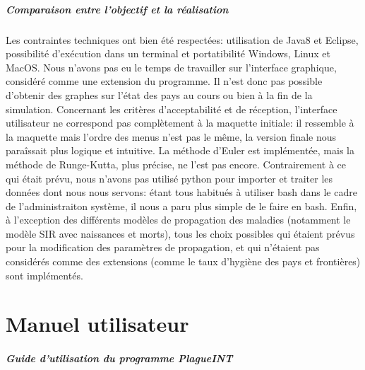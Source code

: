 \documentclass[12pt,a4paper]{report}
\begin{document}
\paragraph{Comparaison entre l'objectif et la réalisation}
\begin{flushleft}
Les contraintes techniques ont bien été respectées: utilisation de Java8 et Eclipse, possibilité d'exécution dans un terminal et portatibilité Windows, Linux et MacOS. Nous n'avons pas eu le temps de travailler sur l'interface graphique, considéré comme une 
extension du programme. Il n'est donc pas possible d'obtenir des graphes sur l'état des pays au cours ou bien à la fin de la simulation.
Concernant les critères d'acceptabilité et de réception, l'interface utilisateur ne correspond pas complètement à la maquette initiale: il ressemble à la maquette mais l'ordre des menus n'est pas le même, la version finale nous paraîssait plus logique et 
intuitive. La méthode d'Euler est implémentée, mais la méthode de Runge-Kutta, plus précise, ne l'est pas encore.
Contrairement à ce qui était prévu, nous n'avons pas utilisé python pour importer et traiter les données dont nous nous servons: étant tous habitués à utiliser bash dans le cadre de l'administraiton système, il nous a paru plus simple de le faire en bash.
Enfin, à l'exception des différents modèles de propagation des maladies (notamment le modèle SIR avec naissances et morts), tous les choix possibles qui étaient prévus pour la modification des paramètres de propagation, et qui n'étaient pas considérés comme 
des extensions (comme le taux d'hygiène des pays et frontières) sont implémentés.
\end{flushleft}

\chapter*{Manuel utilisateur}

\paragraph{Guide d'utilisation du programme PlagueINT}
\end{document}
